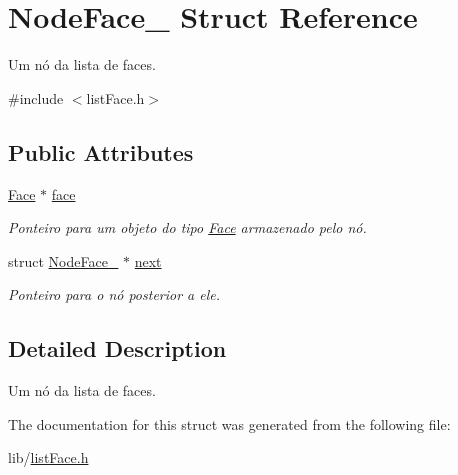 \hypertarget{struct_node_face__}{\section{Node\-Face\-\_\- Struct Reference}
\label{struct_node_face__}
}


Um nó da lista de faces.  




{\ttfamily \#include $<$list\-Face.\-h$>$}

\subsection*{Public Attributes}
\begin{DoxyCompactItemize}
\item 
\hypertarget{struct_node_face___ad94338cf910576bac355801ee92d382a}{\hyperlink{class_face}{Face} $\ast$ \hyperlink{struct_node_face___ad94338cf910576bac355801ee92d382a}{face}}\label{struct_node_face___ad94338cf910576bac355801ee92d382a}

\begin{DoxyCompactList}\small\item\em Ponteiro para um objeto do tipo \hyperlink{class_face}{Face} armazenado pelo nó. \end{DoxyCompactList}\item 
\hypertarget{struct_node_face___a92c55e3c7d4c559c7d639bb6c3fe3f53}{struct \hyperlink{struct_node_face__}{Node\-Face\-\_\-} $\ast$ \hyperlink{struct_node_face___a92c55e3c7d4c559c7d639bb6c3fe3f53}{next}}\label{struct_node_face___a92c55e3c7d4c559c7d639bb6c3fe3f53}

\begin{DoxyCompactList}\small\item\em Ponteiro para o nó posterior a ele. \end{DoxyCompactList}\end{DoxyCompactItemize}


\subsection{Detailed Description}
Um nó da lista de faces. 

The documentation for this struct was generated from the following file\-:\begin{DoxyCompactItemize}
\item 
lib/\hyperlink{list_face_8h}{list\-Face.\-h}\end{DoxyCompactItemize}
